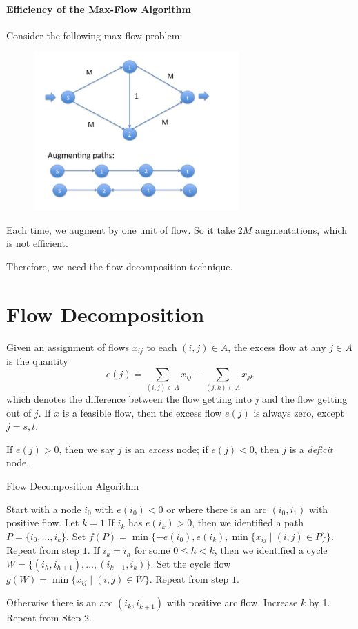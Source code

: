 \paragraph{Efficiency of the Max-Flow Algorithm}
Consider the following max-flow problem:
\begin{figure}[H]
\centering
\includegraphics[width=0.7\textwidth]{Sixth_lecture/p_1}
\end{figure}
Each time, we augment by one unit of flow. So it take $2M$ augmentations, which is not efficient.

Therefore, we need the flow decomposition technique.

\section{Flow Decomposition}
Given an assignment of flows $x_{ij}$ to each $(i,j)\in A$, the excess flow at any $j\in A$ is the quantity
\[
e(j) = \sum_{(i,j)\in A}x_{ij} - \sum_{(j,k)\in A}x_{jk}
\]
which denotes the difference between the flow getting into $j$ and the flow getting out of $j$.
If $x$ is a feasible flow, then the excess flow $e(j)$ is always zero, except $j=s,t$.

If $e(j)>0$, then we say $j$ is an \emph{excess} node; if $e(j)<0$, then $j$ is a \emph{deficit} node.
\begin{algorithm}[htb] 
\caption{Flow Decomposition Algorithm} 
\label{alg:SM} 
\begin{algorithmic}[1] %
\STATE 
Start with a node $i_0$ with $e(i_0)<0$ or where there is an arc $(i_0,i_1)$ with positive flow.
Let $k=1$
\STATE
If $i_k$ has $e(i_k)>0$, then we identified a path $P=\{i_0,\dots,i_k\}$.
Set $f(P) = \min\{-e(i_0),e(i_k),\min\{x_{ij}\mid (i,j)\in P\}\}$.
Repeat from step $1$.
\STATE
If $i_k = i_h$ for some $0\le h<k$, then we identified a cycle $W=\{(i_h,i_{h+1}),\dots,(i_{k-1},i_k)\}$.
Set the cycle flow $g(W)=\min\{x_{ij}\mid (i,j)\in W\}$.
Repeat from step $1$.
\item
Otherwise there is an arc $(i_k,i_{k+1})$ with positive arc flow.
Increase $k$ by 1.
Repeat from Step 2.
\end{algorithmic}
\end{algorithm}

